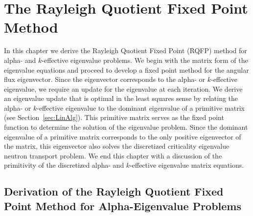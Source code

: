 \chapter{The Rayleigh Quotient Fixed Point Method}
\label{ch3}

In this chapter we derive the Rayleigh Quotient Fixed Point (RQFP) method for alpha- and $k$-effective eigenvalue problems. We begin with the matrix form of the eigenvalue equations and proceed to develop a fixed point method for the angular flux eigenvector. Since the eigenvector corresponds to the alpha- or $k$-effective eigenvalue, we require an update for the eigenvalue at each iteration. We derive an eigenvalue update that is optimal in the least squares sense by relating the alpha- or $k$-effective eigenvalue to the dominant eigenvalue of a primitive matrix (see Section~\ref{sec:LinAlg}). This primitive matrix serves as the fixed point function to determine the solution of the eigenvalue problem. Since the dominant eigenvalue of a primitive matrix corresponds to the only positive eigenvector of the matrix, this eigenvector also solves the discretized criticality eigenvalue neutron transport problem. We end this chapter with a discussion of the primitivity of the discretized alpha- and $k$-effective eigenvalue matrix equations.

\section{Derivation of the Rayleigh Quotient Fixed Point \newline Method for Alpha-Eigenvalue Problems}

